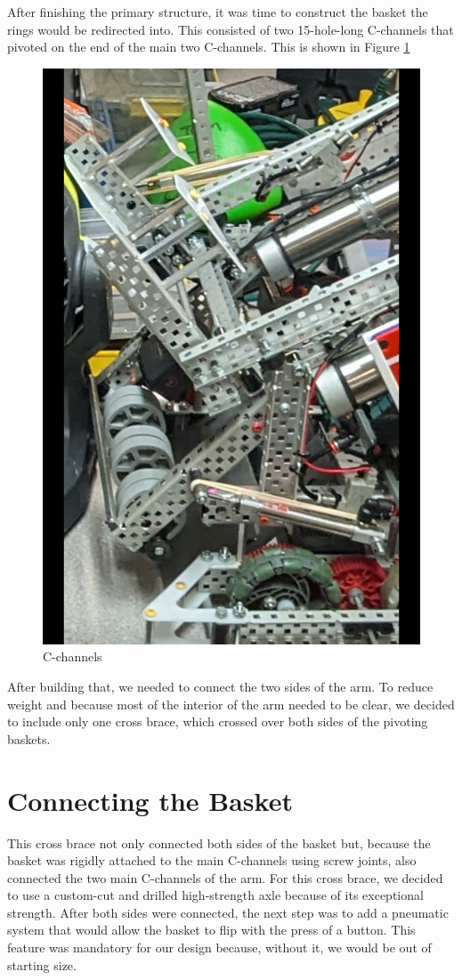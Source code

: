 After finishing the primary structure, it was time to construct the basket the rings would be redirected into. This consisted of two 15-hole-long C-channels that pivoted on the end of the main two C-channels. This is shown in Figure \ref{fig:armc-channels}
\begin{figure}[H]
    \centering
    \includegraphics[width=0.5\linewidth]{images/Armc-channels.png}
    \caption{C-channels}
    \label{fig:armc-channels}
\end{figure}

After building that, we needed to connect the two sides of the arm. To reduce weight and because most of the interior of the arm needed to be clear, we decided to include only one cross brace, which crossed over both sides of the pivoting baskets. 

\section*{Connecting the Basket}

This cross brace not only connected both sides of the basket but, because the basket was rigidly attached to the main C-channels using screw joints, also connected the two main C-channels of the arm. For this cross brace, we decided to use a custom-cut and drilled high-strength axle because of its exceptional strength. After both sides were connected, the next step was to add a pneumatic system that would allow the basket to flip with the press of a button. This feature was mandatory for our design because, without it, we would be out of starting size.

